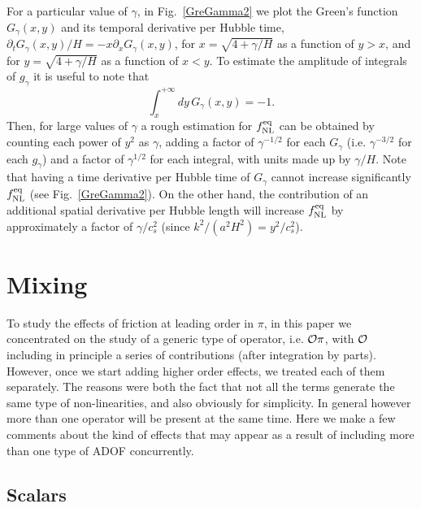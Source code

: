 \documentclass[11pt,amsmath,floats,floatfix,nofootinbib,secnumarabic, superscriptaddress, tightenlines]{revtex4}
\newcommand{\be}{\begin{equation}}
\newcommand{\ee}{\end{equation}}
\newcommand{\calo}{{\cal O}}
\begin{document}
{For a particular value of $\gamma$, in Fig.~\ref{GreGamma2} we plot the Green's function $G_{\gamma}(x,y)$  and its temporal derivative per Hubble time, $\partial_tG_{\gamma}(x,y)/H=-x\partial_xG_{\gamma}(x,y)$, for  $x=\sqrt{4+\gamma/H}$ as a function of $y>x$, and for  $y=\sqrt{4+\gamma/H}$ as a function of $x<y$. To estimate the amplitude of integrals of  $g_{\gamma}$ it is useful to note  that
\be
\int_x^{+\infty} dy\, G_{\gamma}(x,y)=-1.
\ee
Then, for large values of $\gamma$ a rough estimation for $f_{\rm NL}^{\rm eq}$ can be obtained by counting each power of $y^2$ as $\gamma$, adding a factor of  $\gamma^{-1/2}$ for each $G_{\gamma}$ (i.e. $\gamma^{-3/2}$ for each $g_{\gamma}$) and a factor of $\gamma^{1/2}$ for each integral, with units made up by $\gamma/H$. Note that  having a time derivative per Hubble time of $G_{\gamma}$ cannot increase significantly $f_{\rm NL}^{\rm eq}$ (see Fig.~\ref{GreGamma2}). On the other hand, the contribution of an additional spatial derivative per Hubble length will increase $f_{\rm NL}^{\rm eq}$ by approximately a factor of $\gamma/c_s^2$ (since $k^2/(a^2H^2)=y^2/c_s^2$).


\section{Mixing}\label{mixing}

To study the effects of friction at leading order in $\pi$, in this paper we concentrated on the study of a generic
type of operator, i.e. $\calo\pi$, with $\calo$ including in principle a series of contributions (after integration by parts). However,
once we start adding higher order effects, we treated each of them separately. The reasons were both the fact that not all the terms generate the
same type of non-linearities, and also obviously for simplicity. In general however more than one operator will be present at the same time. Here we make a
few comments about the kind of effects that may appear as a result of including more than one
 type of ADOF concurrently.

\subsection{Scalars}\label{mixingscalars}

}
\end{document}
